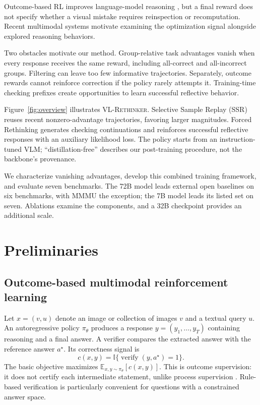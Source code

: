 \documentclass[twocolumn]{article}
\newcommand{\model}{\textsc{VL-Rethinker}\xspace}
\newcommand{\E}{\mathbb{E}}
\newcommand{\ind}{\mathbb{I}}
\begin{document}
Outcome-based RL improves language-model reasoning \citep{deepseek-r1,openai-o1}, but a final reward does not specify whether a visual mistake requires reinspection or recomputation. Recent multimodal systems \citep{mmeureka,r1vl,R1OneVision,OpenVLThinker} motivate examining the optimization signal alongside explored reasoning behaviors.

Two obstacles motivate our method. Group-relative task advantages vanish when every response receives the same reward, including all-correct and all-incorrect groups. Filtering can leave too few informative trajectories. Separately, outcome rewards cannot reinforce correction if the policy rarely attempts it. Training-time checking prefixes create opportunities to learn successful reflective behavior.

Figure~\ref{fig:overview} illustrates \model. Selective Sample Replay (SSR) reuses recent nonzero-advantage trajectories, favoring larger magnitudes. Forced Rethinking generates checking continuations and reinforces successful reflective responses with an auxiliary likelihood loss. The policy starts from an instruction-tuned VLM; ``distillation-free'' describes our post-training procedure, not the backbone's provenance.

We characterize vanishing advantages, develop this combined training framework, and evaluate seven benchmarks. The 72B model leads external open baselines on six benchmarks, with MMMU the exception; the 7B model leads its listed set on seven. Ablations examine the components, and a 32B checkpoint provides an additional scale.

\section{Preliminaries}
\label{sec:prelim}

\subsection{Outcome-based multimodal reinforcement learning}

Let $x=(v,u)$ denote an image or collection of images $v$ and a textual query $u$. An autoregressive policy $\pi_\theta$ produces a response $y=(y_1,\ldots,y_T)$ containing reasoning and a final answer. A verifier compares the extracted answer with the reference answer $a^\star$. Its correctness signal is
\begin{equation}
 c(x,y)=\ind\{\operatorname{verify}(y,a^\star)=1\}.
 \label{eq:correctness}
\end{equation}
The basic objective maximizes $\E_{x,y\sim\pi_\theta}[c(x,y)]$. This is outcome supervision: it does not certify each intermediate statement, unlike process supervision \citep{letsverify}. Rule-based verification is particularly convenient for questions with a constrained answer space.
\end{document}
